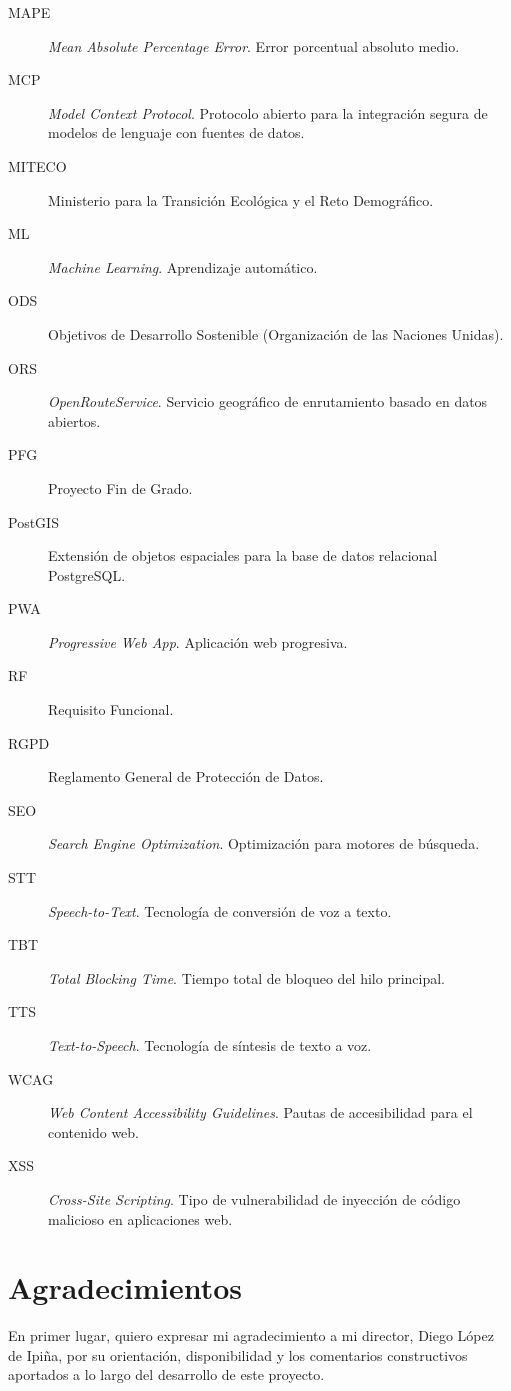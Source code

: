 \documentclass{memoriaPFC}
\begin{document}
\begin{description}
  \item[MAPE] \textit{Mean Absolute Percentage Error}. Error porcentual absoluto medio.
  \item[MCP] \textit{Model Context Protocol}. Protocolo abierto para la integración segura de modelos de lenguaje con fuentes de datos.
  \item[MITECO] Ministerio para la Transición Ecológica y el Reto Demográfico.
  \item[ML] \textit{Machine Learning}. Aprendizaje automático.
  \item[ODS] Objetivos de Desarrollo Sostenible (Organización de las Naciones Unidas).
  \item[ORS] \textit{OpenRouteService}. Servicio geográfico de enrutamiento basado en datos abiertos.
  \item[PFG] Proyecto Fin de Grado.
  \item[PostGIS] Extensión de objetos espaciales para la base de datos relacional PostgreSQL.
  \item[PWA] \textit{Progressive Web App}. Aplicación web progresiva.
  \item[RF] Requisito Funcional.
  \item[RGPD] Reglamento General de Protección de Datos.
  \item[SEO] \textit{Search Engine Optimization}. Optimización para motores de búsqueda.
  \item[STT] \textit{Speech-to-Text}. Tecnología de conversión de voz a texto.
  \item[TBT] \textit{Total Blocking Time}. Tiempo total de bloqueo del hilo principal.
  \item[TTS] \textit{Text-to-Speech}. Tecnología de síntesis de texto a voz.
  \item[WCAG] \textit{Web Content Accessibility Guidelines}. Pautas de accesibilidad para el contenido web.
  \item[XSS] \textit{Cross-Site Scripting}. Tipo de vulnerabilidad de inyección de código malicioso en aplicaciones web.
\end{description}

\clearpage
{}
{}
\chapter*{Agradecimientos}

En primer lugar, quiero expresar mi agradecimiento a mi director, Diego López de Ipiña,
por su orientación, disponibilidad y los comentarios constructivos aportados a lo largo
del desarrollo de este proyecto.
\end{document}
